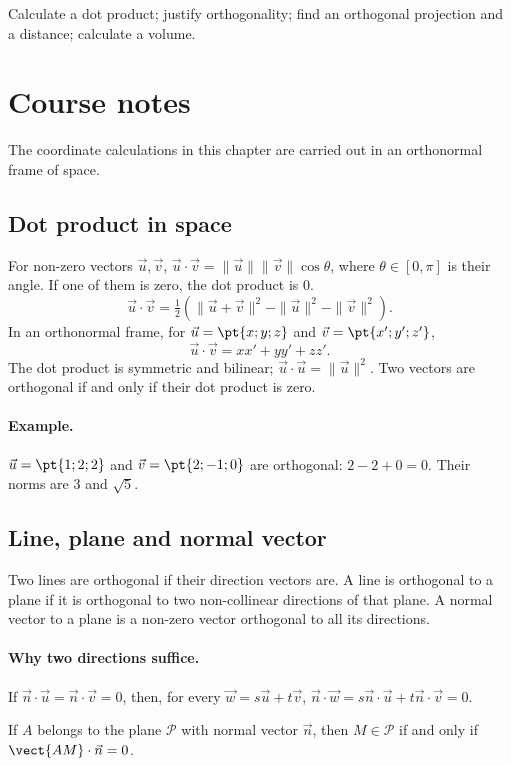 \label{ch:11}


\begin{keypoint}[Objectives]Calculate a dot product; justify orthogonality; find an orthogonal projection and a distance; calculate a volume.\end{keypoint}

\section{Course notes}
The coordinate calculations in this chapter are carried out in an orthonormal frame of space.
\subsection{Dot product in space}
For non-zero vectors $\vec u,\vec v$, $\vec u\cdot\vec v=\|\vec u\|\|\vec v\|\cos\theta$, where $\theta\in[0,\pi]$ is their angle. If one of them is zero, the dot product is $0$.
\[\vec u\cdot\vec v=\tfrac12(\|\vec u+\vec v\|^2-\|\vec u\|^2-\|\vec v\|^2).
\]
In an orthonormal frame, for $\vec u=\pt{x;y;z}$ and $\vec v=\pt{x';y';z'}$,
\[\vec u\cdot\vec v=xx'+yy'+zz'.\]
The dot product is symmetric and bilinear; $\vec u\cdot\vec u=\|\vec u\|^2$. Two vectors are orthogonal if and only if their dot product is zero.
\paragraph{Example.} $\vec u=\pt{1;2;2}$ and $\vec v=\pt{2;-1;0}$ are orthogonal: $2-2+0=0$. Their norms are $3$ and $\sqrt5$.
\subsection{Line, plane and normal vector}
Two lines are orthogonal if their direction vectors are. A line is orthogonal to a plane if it is orthogonal to two non-collinear directions of that plane. A normal vector to a plane is a non-zero vector orthogonal to all its directions.
\paragraph{Why two directions suffice.} If $\vec n\cdot\vec u=\vec n\cdot\vec v=0$, then, for every $\vec w=s\vec u+t\vec v$, $\vec n\cdot\vec w=s\vec n\cdot\vec u+t\vec n\cdot\vec v=0$.
\begin{keypoint}
If $A$ belongs to the plane $\mathcal P$ with normal vector $\vec n$, then $M\in\mathcal P$ if and only if $\vect{AM}\cdot\vec n=0$.
\end{keypoint}
